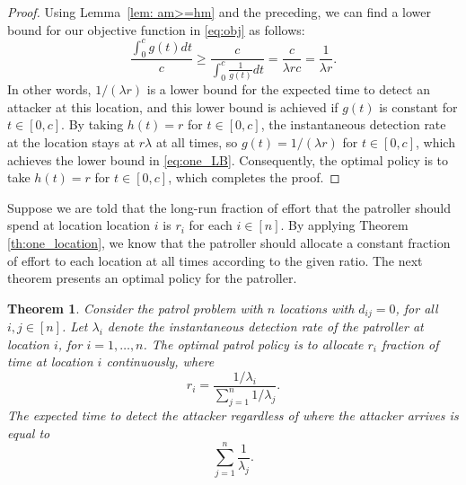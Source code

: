 \documentclass[11pt,a4paper]{article}
\newtheorem{theorem}{Theorem}[section]
\begin{document}
\begin{proof}
Using Lemma~\ref{lem: am>=hm} and the preceding, we can find a lower bound for our objective function in \eqref{eq:obj} as follows:
\begin{equation}
\frac{\int_0^c g(t) dt}{c} \geq \frac{c}{\int_0^c \frac{1}{g(t)} dt} = \frac{c}{\lambda r c} = \frac{1}{\lambda r}.
\label{eq:one_LB}
\end{equation}
In other words,  $1 / (\lambda r)$ is a lower bound for the expected time to detect an attacker at this location, and this lower bound is achieved if $g(t)$ is constant for $t \in [0,c]$.
By taking $h(t) = r$ for $t \in [0,c]$, the instantaneous detection rate at the location stays at $r \lambda$ at all times, so $g(t) = 1/ (\lambda r)$ for $t \in [0,c]$, which achieves the lower bound in \eqref{eq:one_LB}.
Consequently, the optimal policy is to take $h(t) = r$ for $t \in [0,c]$, which completes the proof.
\end{proof}

Suppose we are told that the long-run fraction of effort that the patroller should spend at location location $i$ is $r_i$ for each $i \in [n]$. 
By applying Theorem \ref{th:one_location}, we know that the patroller should allocate a constant fraction of effort to each location at all times according to the given ratio.
The next theorem presents an optimal policy for the patroller.


\begin{theorem}
\label{th:no travel}
Consider the patrol problem with $n$ locations with $d_{ij}=0$, for all $i,j \in [n]$.
Let $\lambda_i$ denote the instantaneous detection rate of the patroller at location $i$, for $i=1,\ldots,n$.
The optimal patrol policy is to allocate $r_i$ fraction of time at location $i$ continuously, where 
\begin{equation}
r_i = \frac{1/\lambda_i}{\sum_{j=1}^n 1/ \lambda_j}.
\label{eq:optimal_allocation}
\end{equation}
The expected time to detect the attacker regardless of where the attacker arrives is equal to 
\[
\sum_{j=1}^n \frac{1}{\lambda_j}.
\]
\end{theorem}
\end{document}
